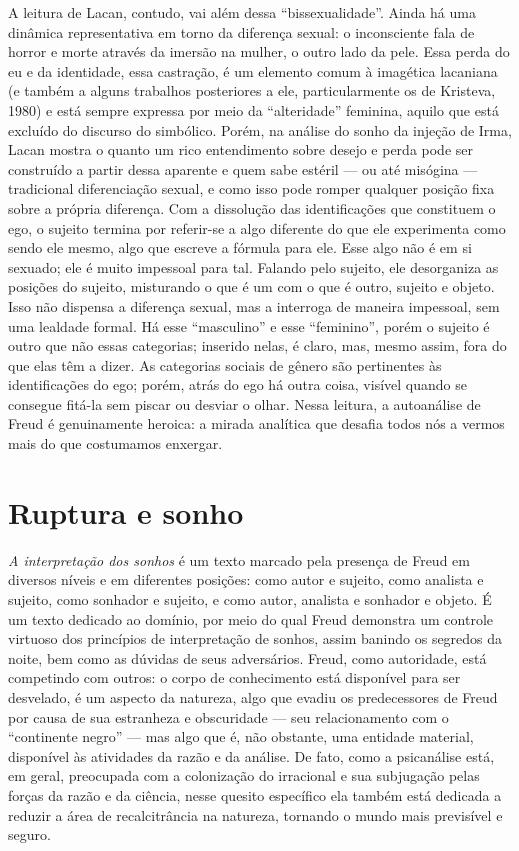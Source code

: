 A leitura de Lacan, contudo, vai além dessa ``bissexualidade''. Ainda há
uma dinâmica representativa em torno da diferença sexual: o inconsciente
fala de horror e morte através da imersão na mulher, o outro lado da
pele. Essa perda do eu e da identidade, essa castração, é um elemento
comum à imagética lacaniana (e também a alguns trabalhos posteriores a
ele, particularmente os de Kristeva, 1980) e está sempre expressa por
meio da ``alteridade'' feminina, aquilo que está excluído do discurso do
simbólico. Porém, na análise do sonho da injeção de Irma, Lacan mostra o
quanto um rico entendimento sobre desejo e perda pode ser construído a
partir dessa aparente e quem sabe estéril --- ou até misógina ---
tradicional diferenciação sexual, e como isso pode romper qualquer
posição fixa sobre a própria diferença. Com a dissolução das
identificações que constituem o ego, o sujeito termina por referir-se a
algo diferente do que ele experimenta como sendo ele mesmo, algo que
escreve a fórmula para ele. Esse algo não é em si sexuado; ele é muito
impessoal para tal. Falando pelo sujeito, ele desorganiza as posições do
sujeito, misturando o que é um com o que é outro, sujeito e objeto. Isso
não dispensa a diferença sexual, mas a interroga de maneira impessoal,
sem uma lealdade formal. Há esse ``masculino'' e esse ``feminino'',
porém o sujeito é outro que não essas categorias; inserido nelas, é
claro, mas, mesmo assim, fora do que elas têm a dizer. As categorias
sociais de gênero são pertinentes às identificações do ego; porém, atrás
do ego há outra coisa, visível quando se consegue fitá-la sem piscar ou
desviar o olhar. Nessa leitura, a autoanálise de Freud é genuinamente
heroica: a mirada analítica que desafia todos nós a vermos mais do que
costumamos enxergar.

\section{Ruptura e sonho}

\emph{A interpretação dos sonhos} é um texto marcado pela presença de
Freud em diversos níveis e em diferentes posições: como autor e sujeito,
como analista e sujeito, como sonhador e sujeito, e como autor, analista
e sonhador e objeto. É um texto dedicado ao domínio, por meio do qual
Freud demonstra um controle virtuoso dos princípios de interpretação de
sonhos, assim banindo os segredos da noite, bem como as dúvidas de seus
adversários. Freud, como autoridade, está competindo com outros: o corpo
de conhecimento está disponível para ser desvelado, é um aspecto da
natureza, algo que evadiu os predecessores de Freud por causa de sua
estranheza e obscuridade --- seu relacionamento com o ``continente
negro'' --- mas algo que é, não obstante, uma entidade material,
disponível às atividades da razão e da análise. De fato, como a
psicanálise está, em geral, preocupada com a colonização do irracional e
sua subjugação pelas forças da razão e da ciência, nesse quesito
específico ela também está dedicada a reduzir a área de recalcitrância
na natureza, tornando o mundo mais previsível e seguro.


